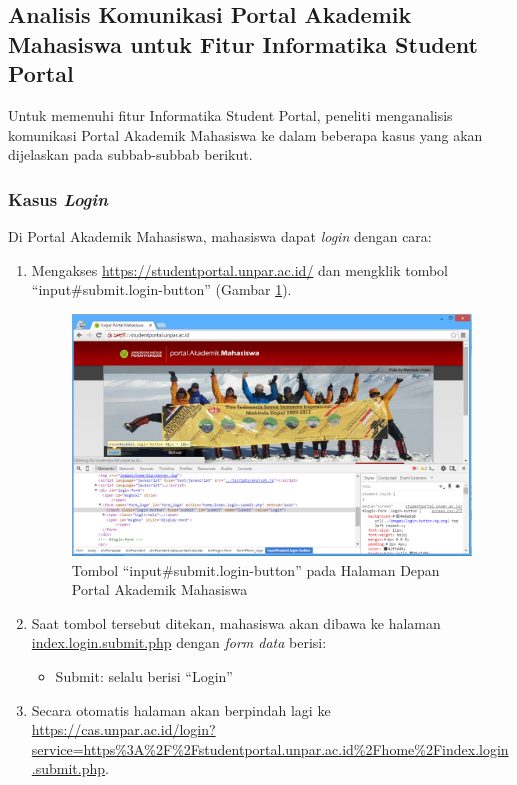 \subsection{Analisis Komunikasi Portal Akademik Mahasiswa untuk Fitur Informatika Student Portal}
Untuk memenuhi fitur Informatika Student Portal, peneliti menganalisis komunikasi Portal Akademik Mahasiswa ke dalam beberapa kasus yang akan dijelaskan pada subbab-subbab berikut.

\subsubsection{Kasus \textit{Login}}
Di Portal Akademik Mahasiswa, mahasiswa dapat \textit{login} dengan cara:
\begin{enumerate}
	\item Mengakses \url{https://studentportal.unpar.ac.id/} dan mengklik tombol ``input\#submit.login-button'' (Gambar \ref{fig:3_case_login}).
	\begin{figure}[H]
			\centering
			\includegraphics[scale=0.5]{Gambar/case-login}
			\caption{Tombol ``input\#submit.login-button'' pada Halaman Depan Portal Akademik Mahasiswa} 
			\label{fig:3_case_login}
		\end{figure}
		
	\item Saat tombol tersebut ditekan, mahasiswa akan dibawa ke halaman \url{index.login.submit.php} dengan \textit{form data} berisi:
			\begin{itemize}
				\item Submit: selalu berisi ``Login''
			\end{itemize}
		
	\item Secara otomatis halaman akan berpindah lagi ke \url{https://cas.unpar.ac.id/login? service=https\%3A\%2F\%2Fstudentportal.unpar.ac.id\%2Fhome\%2Findex.login.submit.php}.
		

\end{enumerate}
